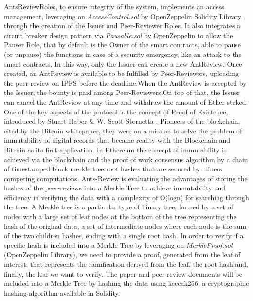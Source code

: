 \documentclass[runningheads]{llncs}
\begin{document}
AntsReviewRoles, to ensure integrity of the system, implements an access management, leveraging on \emph{AccessControl.sol} by OpenZeppelin Solidity Library \cite{OZ}, through the creation of the Issuer and Peer-Reviewer Roles.
\newline It also integrates a circuit breaker design pattern via \emph{Pausable.sol} by OpenZeppelin to allow the Pauser Role, that by default is the Owner of the smart contracts, able to pause (or unpause) the functions in case of a security emergency, like an attack to the smart contracts. In this way, only the Issuer can create a new AntReview.
\newline Once created, an AntReview is available to be fulfilled by Peer-Reviewers, uploading the peer-review on IPFS before the deadline.When the AntReview is accepted by the Issuer, the bounty is paid among Peer-Reviewers.On top of that, the Issuer can cancel the AntReview at any time and withdraw the amount of Ether staked.
\newline One of the key aspects of the protocol is the concept of Proof of Existence, introduced by Stuart Haber \& W. Scott Stornetta \cite{TimeStamp-Haber}. Pioneers of the blockchain, cited by the Bitcoin whitepaper\cite{Bitcoin}, they were on a mission to solve the problem of immutability of digital records that became reality with the Blockchain and Bitcoin as its first application. In Ethereum \cite{Ethereum} the concept of immutability is achieved via the blockchain and the proof of work consensus algorithm by a chain of timestamped block merkle tree root hashes that are secured by miners competing computations.
\newline Ants-Review is evaluating the advantages of storing the hashes of the peer-reviews into a Merkle Tree \cite{BayerHaber1992} to achieve immutability and efficiency in verifying the data with a complexity of O(logn) for searching through the tree.
\newline A Merkle tree is a particular type of binary tree, formed by a set of nodes with a large set of leaf nodes at the bottom of the tree representing the hash of the original data, a set of intermediate nodes where each node is the sum of the two children hashes, ending with a single root hash. In order to verify if a specific hash is included into a Merkle Tree by leveraging on \emph{MerkleProof.sol} (OpenZeppelin Library), we need to provide a proof, generated from the leaf of interest, that represents the ramification derived from the leaf, the root hash and, finally, the leaf we want to verify.
\newline The paper and peer-review documents will be included into a Merkle Tree by hashing the data using keccak256, a cryptographic hashing algorithm available in Solidity.
\end{document}
